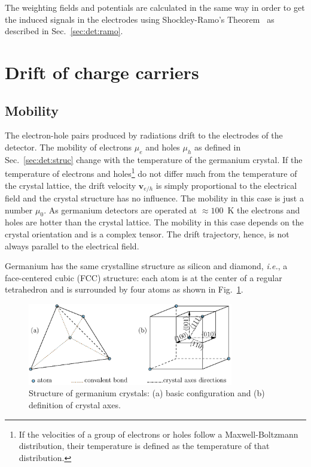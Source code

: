 The weighting fields and potentials are calculated in the same way in order to get the induced signals in the electrodes using Shockley-Ramo's Theorem~\cite{Gat82, Rad88, He00} as described in Sec.~\ref{sec:det:ramo}. 


\section{Drift of charge carriers}
\label{sec:pss:drift}

\subsection{Mobility}
\label{sec:pss:mobi}
The electron-hole pairs produced by radiations drift to the electrodes of the detector. The mobility of electrons $\mu_{e}$ and holes $\mu_{h}$ as defined in Sec.~\ref{sec:det:struc} change with the temperature of the germanium crystal. If the temperature of electrons and holes\footnote{If the velocities of a group of electrons or holes follow a Maxwell-Boltzmann distribution, their temperature is defined as the temperature of that distribution.} do not differ much from the temperature of the crystal lattice, the drift velocity $\mathbf{v}_{e/h}$ is simply proportional to the electrical field and the crystal structure has no influence. The mobility in this case is just a number $\mu_{0}$. As germanium detectors are operated at $\approx 100$~K the electrons and holes are hotter than the crystal lattice. The mobility in this case depends on the crystal orientation and is a complex tensor. The drift trajectory, hence, is not always parallel to the electrical field.

Germanium has the same crystalline structure as silicon and diamond, \textit{i.e.}, a face-centered cubic (FCC) structure: each atom is at the center of a regular tetrahedron and is surrounded by four atoms as shown in Fig.~\ref{fig:pss:xtal}.

\begin{figure}[tbhp]
\centering
\includegraphics[width=0.8\textwidth]{xtalStruc}  
\caption{Structure of germanium crystals: (a) basic configuration and (b) definition of crystal axes.}
\label{fig:pss:xtal}
\end{figure}

